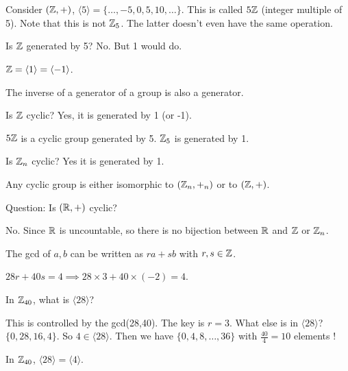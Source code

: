 \documentclass[class=article,crop=false]{standalone}
\begin{document}
\section{}
\begin{eg}[]
	Consider $(\mathbb{Z},+)$, $\langle 5 \rangle = \{ \ldots, -5,0,5,10,\ldots\} $. This is called $5\mathbb{Z}$ (integer multiple of 5). Note that this is not $\mathbb{Z}_5$. The latter doesn't even have the same operation.
\end{eg}

Is $\mathbb{Z}$ generated by 5? No. But 1 would do.

$\mathbb{Z} = \langle 1 \rangle = \langle -1 \rangle$.

\begin{lem}[]
The inverse of a generator of a group is also a generator.
\end{lem}

Is $\mathbb{Z}$ cyclic? Yes, it is generated by 1 (or -1).

$5\mathbb{Z}$ is a cyclic group generated by 5. $\mathbb{Z}_5$ is generated by 1.

Is $\mathbb{Z}_n$ cyclic? Yes it is generated by 1. 

\begin{thm}[]
	Any cyclic group is either isomorphic to $(\mathbb{Z}_n,+_{n} )$ or to $(\mathbb{Z},+)$.
\end{thm}

Question: Is $(\mathbb{R},+)$ cyclic?

No. Since $\mathbb{R}$ is uncountable, so there is no bijection between $\mathbb{R}$ and $\mathbb{Z}$ or $\mathbb{Z}_n$.

\begin{defn}

\end{defn}

\begin{note}[]
The gcd of $a,b$ can be written as  $ra+sb$ with  $r,s \in \mathbb{Z}$.
\end{note}

\begin{eg}[]
	$28r+40s=4 \implies 28 \times 3 + 40 \times (-2) =4$.
\end{eg}

\begin{eg}[]
	In $\mathbb{Z}_{40}$, what is $\langle 28 \rangle$?

	This is controlled by the gcd(28,40). The key is $r=3$. What else is in $\langle 28 \rangle$? $\{0, 28, 16,4\} $. So $4 \in \langle 28 \rangle$. Then we have $\{0,4,8,\ldots,36\} $ with $\frac{40}{4}=10$ elements !

	In $\mathbb{Z}_{40}$, $\langle 28 \rangle=\langle 4 \rangle$.
\end{eg}
\end{document}
